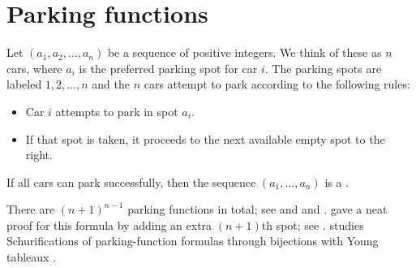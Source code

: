

\section[parkingFunctions]{Parking functions}


\begin{definition}
Let $(a_1, a_2, \dotsc, a_n)$ be a sequence of positive integers.
We think of these as $n$ cars, where $a_i$ is the preferred parking spot
for car $i$.
The parking spots are labeled $1, 2, \dotsc, n$ and the $n$ cars attempt
to park according to the following rules:
\begin{itemize}
  \item Car \( i \) attempts to park in spot \( a_i \).
  \item If that spot is taken, it proceeds to the next available empty
        spot to the right.
\end{itemize}
If all cars can park successfully, then the sequence
\( (a_1, \dotsc, a_n) \) is a
\label{parkingFunctionDefinition}.
\end{definition}

There are $(n+1)^{n-1}$ parking functions in total; see
 \cite{Pyke1959} and 
and  \cite{KonheimWeiss1966}.
 gave a neat proof for this formula
by adding an extra $(n+1)$th spot; see 
\cite{Riordan1969}.
 studies Schurifications of parking-function formulas
through bijections with Young tableaux \cite{Wallace2020x}.

